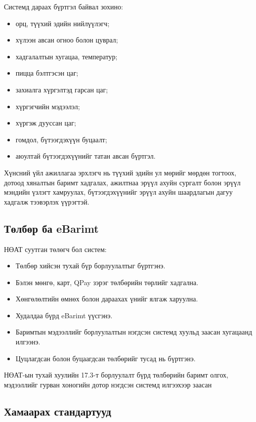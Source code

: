 Системд дараах бүртгэл байвал зохино:
\begin{itemize}
    \item орц, түүхий эдийн нийлүүлэгч;
    \item хүлээн авсан огноо болон цуврал;
    \item хадгалалтын хугацаа, температур;
    \item пицца бэлтгэсэн цаг;
    \item захиалга хүргэлтэд гарсан цаг;
    \item хүргэгчийн мэдээлэл;
    \item хүргэж дууссан цаг;
    \item гомдол, бүтээгдэхүүн буцаалт;
    \item аюултай бүтээгдэхүүнийг татан авсан бүртгэл.
\end{itemize}

Хүнсний үйл ажиллагаа эрхлэгч нь түүхий эдийн ул мөрийг мөрдөн тогтоох, дотоод хяналтын баримт хадгалах, ажилтнаа эрүүл ахуйн сургалт болон эрүүл мэндийн үзлэгт хамруулах, бүтээгдэхүүнийг эрүүл ахуйн шаардлагын дагуу хадгалж тээвэрлэх үүрэгтэй.

\subsection{Төлбөр ба eBarimt}

НӨАТ суутган төлөгч бол систем:
\begin{itemize}
    \item Төлбөр хийсэн тухай бүр борлуулалтыг бүртгэнэ.
    \item Бэлэн мөнгө, карт, QPay зэрэг төлбөрийн төрлийг хадгална.
    \item Хөнгөлөлтийн өмнөх болон дараахах үнийг ялгаж харуулна.
    \item Худалдаа бүрд eBarimt үүсгэнэ.
    \item Баримтын мэдээллийг борлуулалтын нэгдсэн системд хуульд заасан хугацаанд илгээнэ.
    \item Цуцлагдсан болон буцаагдсан төлбөрийг тусад нь бүртгэнэ.
\end{itemize}

НӨАТ-ын тухай хуулийн 17.3-т борлуулалт бүрд төлбөрийн баримт олгох, мэдээллийг гурван хоногийн дотор нэгдсэн системд илгээхээр заасан


\subsection{Хамаарах стандартууд}

